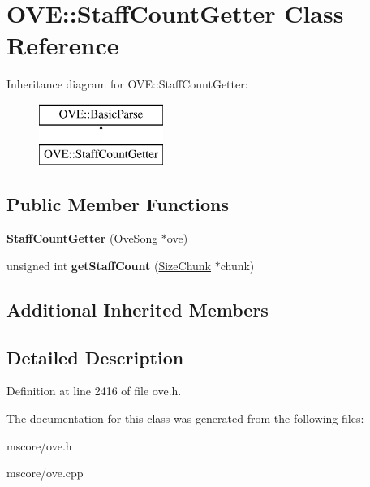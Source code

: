 \hypertarget{class_o_v_e_1_1_staff_count_getter}{}\section{O\+VE\+:\+:Staff\+Count\+Getter Class Reference}
\label{class_o_v_e_1_1_staff_count_getter}
Inheritance diagram for O\+VE\+:\+:Staff\+Count\+Getter\+:\begin{figure}[H]
\begin{center}
\leavevmode
\includegraphics[height=2.000000cm]{class_o_v_e_1_1_staff_count_getter}
\end{center}
\end{figure}
\subsection*{Public Member Functions}
\begin{DoxyCompactItemize}
\item 
\mbox{\label{class_o_v_e_1_1_staff_count_getter_acfca90c7179933578b5907325f0213ce}} 
{\bfseries Staff\+Count\+Getter} (\hyperlink{class_o_v_e_1_1_ove_song}{Ove\+Song} $\ast$ove)
\item 
\mbox{\label{class_o_v_e_1_1_staff_count_getter_ade5ca1f5a972a74e0ab6106e7c1a297a}} 
unsigned int {\bfseries get\+Staff\+Count} (\hyperlink{class_o_v_e_1_1_size_chunk}{Size\+Chunk} $\ast$chunk)
\end{DoxyCompactItemize}
\subsection*{Additional Inherited Members}


\subsection{Detailed Description}


Definition at line 2416 of file ove.\+h.



The documentation for this class was generated from the following files\+:\begin{DoxyCompactItemize}
\item 
mscore/ove.\+h\item 
mscore/ove.\+cpp\end{DoxyCompactItemize}
